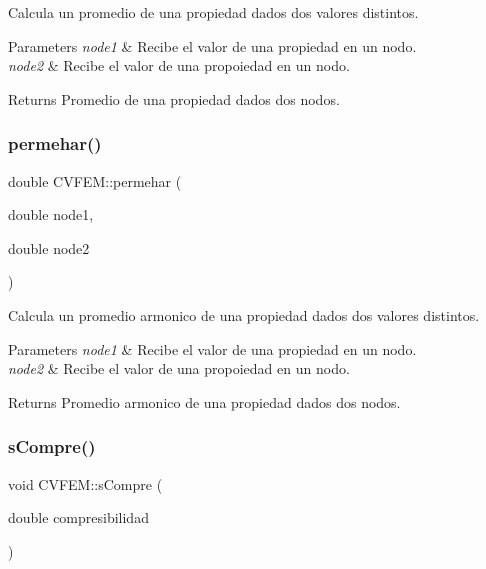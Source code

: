 Calcula un promedio de una propiedad dados dos valores distintos. 


\begin{DoxyParams}{Parameters}
{\em node1} & Recibe el valor de una propiedad en un nodo. \\
\hline
{\em node2} & Recibe el valor de una propoiedad en un nodo. \\
\hline
\end{DoxyParams}
\begin{DoxyReturn}{Returns}
Promedio de una propiedad dados dos nodos. 
\end{DoxyReturn}
\hypertarget{class_c_v_f_e_m_af670f51f93d3f38f146ab05ae1527f4d}{}\label{class_c_v_f_e_m_af670f51f93d3f38f146ab05ae1527f4d} 
\subsubsection{\texorpdfstring{permehar()}{permehar()}}
{\footnotesize\ttfamily double C\+V\+F\+E\+M\+::permehar (\begin{DoxyParamCaption}\item[{double}]{node1,  }\item[{double}]{node2 }\end{DoxyParamCaption})\hspace{0.3cm}{\ttfamily [inline]}}



Calcula un promedio armonico de una propiedad dados dos valores distintos. 


\begin{DoxyParams}{Parameters}
{\em node1} & Recibe el valor de una propiedad en un nodo. \\
\hline
{\em node2} & Recibe el valor de una propoiedad en un nodo. \\
\hline
\end{DoxyParams}
\begin{DoxyReturn}{Returns}
Promedio armonico de una propiedad dados dos nodos. 
\end{DoxyReturn}
\hypertarget{class_c_v_f_e_m_ac60363ea7805dbb4a8c3d42b5d849bba}{}\label{class_c_v_f_e_m_ac60363ea7805dbb4a8c3d42b5d849bba} 
\subsubsection{\texorpdfstring{s\+Compre()}{sCompre()}}
{\footnotesize\ttfamily void C\+V\+F\+E\+M\+::s\+Compre (\begin{DoxyParamCaption}\item[{double}]{compresibilidad }\end{DoxyParamCaption})\hspace{0.3cm}{\ttfamily [inline]}}



